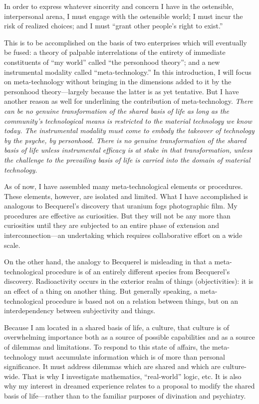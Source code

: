 In order to express whatever sincerity and concern I have in the ostensible, 
interpersonal arena, I must engage with the ostensible world; I must incur the risk 
of realized choices; and I must \enquote{grant other people's right to exist.} 

\visbreak

This is to be accomplished on the basis of two enterprises which will eventually be 
fused: a theory of palpable interrelations of the entirety of immediate constituents 
of \enquote{my world} called \enquote{the personhood theory}; and a new instrumental modality 
called \enquote{meta-technology.} In this introduction, I will focus on meta-technology 
without bringing in the dimensions added to it by the personhood theory---largely 
because the latter is as yet tentative. But I have another reason as well for 
underlining the contribution of meta-technology. \textit{There can be no genuine transformation 
of the shared basis of life as long as the community's technological means is restricted to the 
material technology we know today. The instrumental modality must come to embody the 
takeover of technology by the psyche, by personhood. There is no genuine transformation 
of the shared basis of life unless instrumental efficacy is at stake in that transformation, 
unless the challenge to the prevailing basis of life is carried into the domain of material 
technology.}

As of now, I have assembled many meta-technological elements or procedures. 
These elements, however, are isolated and limited. What I have accomplished is 
analogous to Becquerel's discovery that uranium fogs photographic film. My 
procedures are effective as curiosities. But they will not be any more than curiosities 
until they are subjected to an entire phase of extension and interconnection---an 
undertaking which requires collaborative effort on a wide scale. 

On the other hand, the analogy to Becquerel is misleading in that a meta-technological 
procedure is of an entirely different species from Becquerel's discovery. 
Radioactivity occurs in the exterior realm of things (objectivities): it is an 
effect of a thing on another thing. But generally speaking, a meta-technological 
procedure is based not on a relation between things, but on an interdependency 
between subjectivity and things. 

Because I am located in a shared basis of life, a culture, that culture is of 
overwhelming importance both as a source of possible capabilities and as a source 
of dilemmas and limitations. To respond to this state of affairs, the meta-technology 
must accumulate information which is of more than personal significance. It must 
address dilemmas which are shared and which are culture-wide. That is why I 
investigate mathematics, \enquote{real-world} logic, etc. It is also why my interest in 
dreamed experience relates to a proposal to modify the shared basis of life---rather 
than to the familiar purposes of divination and psychiatry. 

